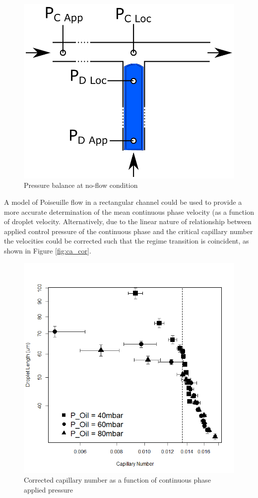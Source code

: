\begin{figure}[H]
\centering 
\includegraphics[width=0.75\columnwidth]{pressureBalance.PNG} 
\caption[Pressure Balance at no-flow condition.]{Pressure balance at no-flow condition} 
\label{fig:pressureBalance} 
\end{figure}


A model of Poiseuille flow in a rectangular channel could be used to provide a more accurate determination of the mean continuous phase velocity (as a function of droplet velocity. Alternatively, due to the linear nature of relationship between applied control pressure of the continuous phase and the critical capillary number the velocities could be corrected such that the regime transition is coincident, as shown in Figure \vref{fig:ca_cor}.

\begin{figure}[H]
\centering 
\includegraphics[width=0.75\columnwidth]{Ca_cor.PNG} 
\caption[Corrected capillary number as a function of continuous phase applied pressure]{Corrected capillary number as a function of continuous phase applied pressure} 
\label{fig:ca_cor} 
\end{figure}

